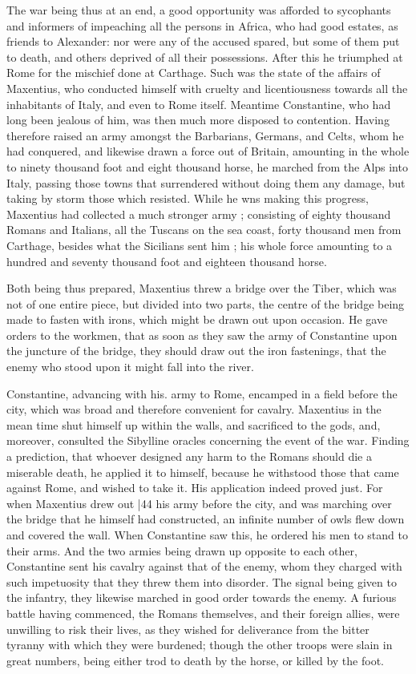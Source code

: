 The war being thus at an end, a good opportunity was afforded to sycophants and informers of impeaching all the persons in Africa, who had good estates, as friends to Alexander: nor were any of the accused spared, but some of them put to death, and others deprived of all their possessions. After this he triumphed at Rome for the mischief done at Carthage. Such was the state of the affairs of Maxentius, who conducted himself with cruelty and licentiousness towards all the inhabitants of Italy, and even to Rome itself. Meantime Constantine, who had long been jealous of him, was then much more disposed to contention. Having therefore raised an army amongst the Barbarians, Germans, and Celts, whom he had conquered, and likewise drawn a force out of Britain, amounting in the whole to ninety thousand foot and eight thousand horse, he marched from the Alps into Italy, passing those towns that surrendered without doing them any damage, but taking by storm those which resisted. While he wns making this progress, Maxentius had collected a much stronger army ; consisting of eighty thousand Romans and Italians, all the Tuscans on the sea coast, forty thousand men from Carthage, besides what the Sicilians sent him ; his whole force amounting to a hundred and seventy thousand foot and eighteen thousand horse.

Both being thus prepared, Maxentius threw a bridge over the Tiber, which was not of one entire piece, but divided into two parts, the centre of the bridge being made to fasten with irons, which might be drawn out upon occasion. He gave orders to the workmen, that as soon as they saw the army of Constantine upon the juncture of the bridge, they should draw out the iron fastenings, that the enemy who stood upon it might fall into the river.

Constantine, advancing with his. army to Rome, encamped in a field before the city, which was broad and therefore convenient for cavalry. Maxentius in the mean time shut himself up within the walls, and sacrificed to the gods, and, moreover, consulted the Sibylline oracles concerning the event of the war. Finding a prediction, that whoever designed any harm to the Romans should die a miserable death, he applied it to himself, because he withstood those that came against Rome, and wished to take it. His application indeed proved just. For when Maxentius drew out
|44 his army before the city, and was marching over the bridge that he himself had constructed, an infinite number of owls flew down and covered the wall. When Constantine saw this, he ordered his men to stand to their arms. And the two armies being drawn up opposite to each other, Constantine sent his cavalry against that of the enemy, whom they charged with such impetuosity that they threw them into disorder. The signal being given to the infantry, they likewise marched in good order towards the enemy. A furious battle having commenced, the Romans themselves, and their foreign allies, were unwilling to risk their lives, as they wished for deliverance from the bitter tyranny with which they were burdened; though the other troops were slain in great numbers, being either trod to death by the horse, or killed by the
foot.

